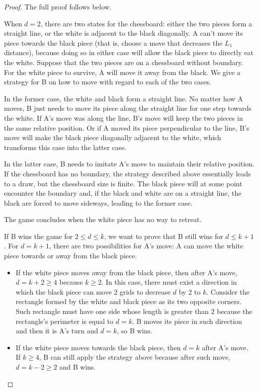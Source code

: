 \documentclass[a4paper]{article}
\theoremstyle{definition}
\begin{document}
\begin{proof}
    The full proof follows below.

    When $d = 2$, there are two states for the chessboard: either the two pieces
    form a straight line, or the white is adjacent to the black diagonally. A
    can't move its piece towards the black piece (that is, choose a move that
    decreases the $L_1$ distance), because doing so in either case will allow
    the black piece to directly eat the white. Suppose that the two pieces are
    on a chessboard without boundary. For the white piece to survive, A will
    move it away from the black. We give a strategy for B on how to move with
    regard to each of the two cases.

    In the former case, the white and black form a straight line. No matter how
    A moves, B just needs to move its piece along the straight line for one step
    towards the white. If A's move was along the line, B's move will keep the
    two pieces in the same relative position. Or if A moved its piece
    perpendicular to the line, B's move will make the black piece diagonally
    adjacent to the white, which transforms this case into the latter case.

    In the latter case, B needs to imitate A's move to maintain their relative
    position. If the chessboard has no boundary, the strategy described above
    essentially leads to a draw, but the chessboard size is finite. The black
    piece will at some point encounter the boundary and, if the black and white
    are on a straight line, the black are forced to move sideways, leading to
    the former case.

    The game concludes when the white piece has no way to retreat.

    If B wins the game for $2 \leq d \leq k$, we want to prove that B still wins
    for $d \leq k + 1$. For $d = k + 1$, there are two possibilities for A's
    move: A can move the white piece towards or away from the black piece.
    \begin{itemize}
        \item If the white piece moves away from the black piece, then after A's
        move, $d = k + 2 \geq 4$ because $k \geq 2$. In this case, there must
        exist a direction in which the black piece can move 2 grids to decrease
        $d$ by 2 to $k$. Consider the rectangle formed by the white and black
        piece as its two opposite corners. Such rectangle must have one side
        whose length is greater than 2 because the rectangle's perimeter is
        equal to $d = k$. B moves its piece in such direction and then it is A's
        turn and $d = k$, so B wins.
        \item If the white piece moves towards the black piece, then $d = k$
        after A's move. If $k \geq 4$, B can still apply the strategy above
        because after such move, $d = k - 2 \geq 2$ and B wins.


\end{itemize}
\end{proof}
\end{document}
